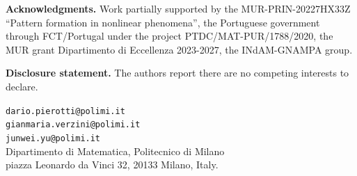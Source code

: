 \documentclass[10pt]{article}
\theoremstyle{definition}
\numberwithin{equation}{section}
\begin{document}
\textbf{Acknowledgments.} Work partially supported by the MUR-PRIN-20227HX33Z 
``Pattern formation in nonlinear phenomena'', the Portuguese government through FCT/Portugal
under the project PTDC/MAT-PUR/1788/2020, the MUR grant Dipartimento di Eccellenza 2023-2027, 
the INdAM-GNAMPA group.\bigskip


\textbf{Disclosure statement.} The authors report there are no competing interests to declare.




{}

%
\medskip
\small

\begin{flushright}
{\tt dario.pierotti@polimi.it}\\
{\tt gianmaria.verzini@polimi.it}\\
{\tt junwei.yu@polimi.it}\\
Dipartimento di Matematica, Politecnico di Milano\\
piazza Leonardo da Vinci 32, 20133 Milano, Italy.
\end{flushright}
\end{document}

